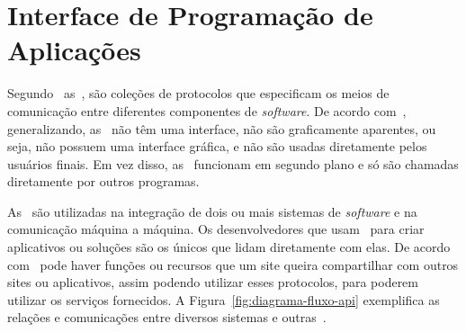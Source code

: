 \section{Interface de Programação de Aplicações}\label{sec:api}

Segundo~\textcite{borgogno2019} as~,
são coleções de protocolos que especificam os meios de comunicação
entre diferentes componentes de \textit{software}.
De acordo com~\textcite{biehl2015}, generalizando, as~ não
têm uma interface, não são graficamente aparentes, ou seja, não possuem uma
interface gráfica, e não são usadas diretamente pelos usuários finais.
Em vez disso, as~ funcionam em segundo plano e só são chamadas
diretamente por outros programas.

As~ são utilizadas na integração de dois ou mais sistemas de
\textit{software} e na comunicação máquina a máquina.
Os desenvolvedores que usam~ para criar aplicativos ou
soluções são os únicos que lidam diretamente com elas.
De acordo com~\textcite{russel2019} pode haver funções ou recursos que um
site queira compartilhar com outros sites ou aplicativos, assim podendo
utilizar esses protocolos, para poderem utilizar os serviços fornecidos.
A Figura~\ref{fig:diagrama-fluxo-api} exemplifica as relações e
comunicações entre diversos sistemas e outras~.

